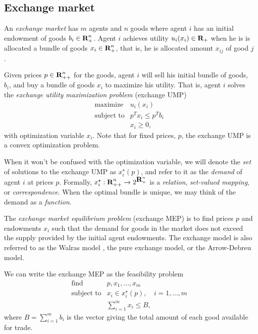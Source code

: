 \documentclass[12pt]{article}
\begin{document}
\subsection{Exchange market}
\label{sec:exchange_def}
An \emph{exchange market} has $m$ agents and $n$ goods where
agent $i$ has an initial endowment of goods $b_i \in {\mbox{\bf R}}_+^n$.
Agent $i$ achieves utility $u_i(x_i) \in {\mbox{\bf R}}_+$ when he is is allocated a
bundle of goods $x_i \in {\mbox{\bf R}}^n_{+}$,
that is, he is allocated amount $x_{ij}$ of good $j$.

Given prices $p \in {\mbox{\bf R}}^n_{++}$ for the goods, agent $i$ will sell his
initial bundle of goods, $b_i$, and buy a bundle of goods
$x_i$ to maximize his utility.
That is, agent $i$ solves the \emph{exchange utility maximization problem} (exchange UMP)
\begin{equation}
\label{p-ump}
\begin{array}{ll}
\mbox{maximize} & u_i(x_i) \\
\mbox{subject to} & p^T x_i \leq p^T b_i \\
& x_i \geq 0,
\end{array}
\end{equation}
with optimization variable $x_i$. Note that for fixed prices, $p$, the exchange UMP is a convex optimization problem.

When it won't be confused with the optimization variable,
we will denote the \emph{set} of solutions to the exchange UMP as $x^\star_i(p)$,
and refer to it as the \emph{demand} of agent $i$ at prices $p$.
Formally, $x_i^\star : {\mbox{\bf R}}^n_{++} \to 2^{{\mbox{\bf R}}^n_+}$ is a
\emph{relation}, \emph{set-valued mapping}, or \emph{correspondence}.
When the optimal bundle is unique, we may think of
the demand as a \emph{function}.

The \emph{exchange market equilibrium problem} (exchange MEP) is to find prices $p$ and endowments $x_i$
such that the demand for goods in the market does not exceed the supply
provided by the initial agent endowments.
The exchange model is also referred to as the Walras model \cite{walras1896elements},
the pure exchange model, or the Arrow-Debreu model.

We can write the exchange MEP as the feasibility problem
\begin{equation}
\label{p-mep}
\begin{array}{ll}
\mbox{find} & p, x_1, \ldots, x_m \\
\mbox{subject to} & x_i \in x_i^\star(p),\quad i = 1,\ldots, m \\
& \sum_{i=1}^m x_i \leq B,
\end{array}
\end{equation}
where $B = \sum_{i=1}^m b_i$ is the vector giving the total amount of each good
available for trade.
\end{document}
